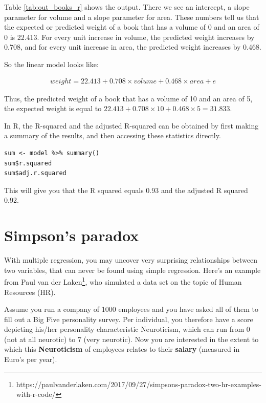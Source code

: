 \documentclass[]{book}\usepackage[]{graphicx}\usepackage[]{color}
\begin{document}
Table \ref{tab:out_books_r} shows the output. There we see an intercept, a slope parameter for volume and a slope parameter for area. These numbers tell us that the expected or predicted weight of a book that has a volume of 0 and an area of 0 is 22.413. For every unit increase in volume, the predicted weight increases by 0.708, and for every unit increase in area, the predicted weight increases by 0.468.

So the linear model looks like:


\begin{eqnarray}
weight =  22.413 + 0.708 \times volume + 0.468 \times area + e
\end{eqnarray}

Thus, the predicted weight of a book that has a volume of 10 and an area of 5, the expected weight is equal to $22.413 + 0.708 \times 10 + 0.468 \times 5 = 31.833$.

In R, the R-squared and the adjusted R-squared can be obtained by first making a summary of the results, and then accessing these statistics directly.

\begin{lstlisting}
sum <- model %>% summary()
sum$r.squared
sum$adj.r.squared
\end{lstlisting}


This will give you that the R squared equals 0.93 and the adjusted R squared 0.92. 



\section{Simpson's paradox}

With multiple regression, you may uncover very surprising relationships between two variables, that can never be found using simple regression. Here's an example from Paul van der Laken\footnote{https://paulvanderlaken.com/2017/09/27/simpsons-paradox-two-hr-examples-with-r-code/}, who simulated a data set on the topic of Human Resources (HR).

Assume you run a company of 1000 employees and you have asked all of them to fill out a Big Five personality survey. Per individual, you therefore have a score depicting his/her personality characteristic Neuroticism, which can run from 0 (not at all neurotic) to 7 (very neurotic). Now you are interested in the extent to which this \textbf{Neuroticism} of employees relates to their \textbf{salary} (measured in Euro’s per year).
\end{document}
